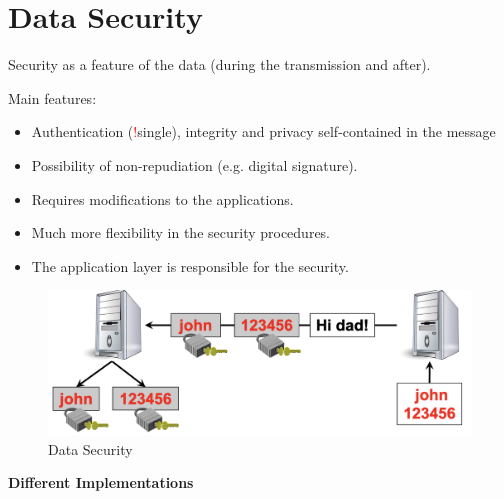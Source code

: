 \section{Data Security}
\begin{center}
    Security as a feature of the data (during the transmission and after).
\end{center}

Main features:
\begin{itemize}
    \item Authentication (\textcolor{Red}{!}single), integrity and privacy self-contained in the message
    \item Possibility of non-repudiation (e.g. digital signature).
    \item Requires modifications to the applications.
    \item Much more flexibility in the security procedures.
    \item The application layer is responsible for the security.
\end{itemize}

\begin{figure}[H]
    \centering
    \includegraphics[width=0.8\linewidth]{Images/Appsec/data_security.png}
    \caption{Data Security}
\end{figure}

\clearpage

\begin{center}
    \textbf{Different Implementations}
\end{center}


